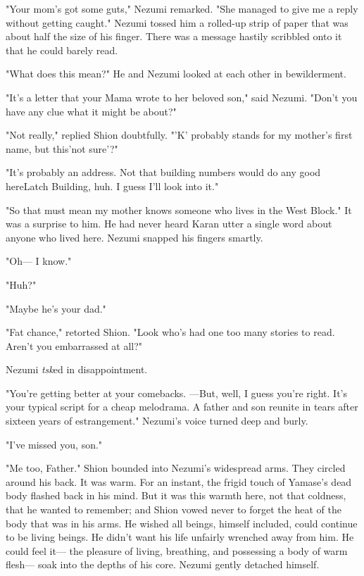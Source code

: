 "Your mom's got some guts," Nezumi remarked. "She managed to give me a
reply without getting caught." Nezumi tossed him a rolled-up strip of
paper that was about half the size of his finger. There was a message
hastily scribbled onto it that he could barely read.


"What does this mean?" He and Nezumi looked at each other in
bewilderment.

"It's a letter that your Mama wrote to her beloved son," said Nezumi.
"Don't you have any clue what it might be about?"

"Not really," replied Shion doubtfully. "'K' probably stands for my
mother's first name, but this\el 'not sure'\el ?"

"It's probably an address. Not that building numbers would do any good
here\el Latch Building, huh. I guess I'll look into it."

"So that must mean my mother knows someone who lives in the West Block."
It was a surprise to him. He had never heard Karan utter a single word
about anyone who lived here. Nezumi snapped his fingers smartly.

"Oh--- I know."

"Huh?"

"Maybe he's your dad."

"Fat chance," retorted Shion. "Look who's had one too many stories to
read. Aren't you embarrassed at all?"

Nezumi \emph{tsk}ed in disappointment.

"You're getting better at your comebacks. ---But, well, I guess you're
right. It's your typical script for a cheap melodrama. A father and son
reunite in tears after sixteen years of estrangement." Nezumi's voice
turned deep and burly.

"I've missed you, son."

"Me too, Father." Shion bounded into Nezumi's widespread arms. They
circled around his back. It was warm. For an instant, the frigid touch
of Yamase's dead body flashed back in his mind. But it was this warmth
here, not that coldness, that he wanted to remember; and Shion vowed
never to forget the heat of the body that was in his arms. He wished all
beings, himself included, could continue to be living beings. He didn't
want his life unfairly wrenched away from him. He could feel it--- the
pleasure of living, breathing, and possessing a body of warm flesh--- soak
into the depths of his core. Nezumi gently detached himself.

